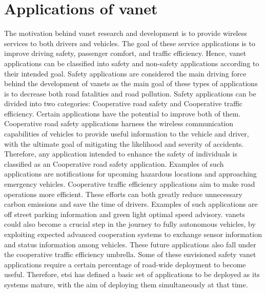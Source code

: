 \section[Applications of VANET]{Applications of \gls{vanet}}
\label{sec:Applications_of_VANETs}
The motivation behind \gls{vanet} research and development is to provide wireless services to both drivers and vehicles. The goal of these service applications is to improve driving safety, passenger comfort, and traffic efficiency. Hence, \gls{vanet} applications can be classified into safety and non-safety applications according to their intended goal.
Safety applications are considered the main driving force behind the development of \glspl{vanet}\cite{liang_vehicular_2015} as the main goal of these types of applications is to decrease both road fatalities and road pollution\cite{al-sultan_comprehensive_2014}. Safety applications can be divided into two categories: Cooperative road safety and Cooperative traffic efficiency. Certain applications have the potential to improve both of them.
Cooperative road safety applications harness the wireless communication capabilities of vehicles to provide useful information to the vehicle and driver, with the ultimate goal of mitigating the likelihood and severity of accidents. Therefore, any application intended to enhance the safety of individuals is classified as an Cooperative road safety application. Examples of such applications are notifications for upcoming hazardous locations and approaching emergency vehicles.
Cooperative traffic efficiency applications aim to make road operations more efficient. These efforts can both greatly reduce unnecessary carbon emissions and save the time of drivers. Examples of such applications are off street parking information and green light optimal speed advisory.
\glspl{vanet} could also become a crucial step in the journey to fully autonomous vehicles, by exploiting expected advanced cooperation systems to exchange sensor information and status information among vehicles. These future applications also fall under the cooperative traffic efficiency umbrella.
Some of these envisioned safety \gls{vanet} applications require a certain percentage of road-wide deployment to become useful\cite{jakubiak_state_2008}. Therefore, \gls{etsi} has defined a basic set of applications to be deployed as \gls{its} systems mature, with the aim of deploying them simultaneously at that time. 
